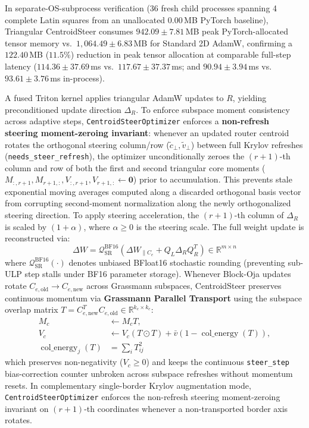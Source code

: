\documentclass[10pt,twocolumn,letterpaper]{article}
\begin{document}
\begin{enumerate}
    In separate-OS-subprocess verification (36 fresh child processes spanning 4 complete Latin squares from an unallocated $0.00$\,MB PyTorch baseline), Triangular CentroidSteer consumes $942.09 \pm 7.81$\,MB peak PyTorch-allocated tensor memory vs.\ $1,064.49 \pm 6.83$\,MB for Standard 2D AdamW, confirming a $122.40$\,MB ($11.5\%$) reduction in peak tensor allocation at comparable full-step latency ($114.36 \pm 37.69$\,ms vs.\ $117.67 \pm 37.37$\,ms; and $90.94 \pm 3.94$\,ms vs.\ $93.61 \pm 3.76$\,ms in-process).
\end{enumerate}

A fused Triton kernel applies triangular AdamW updates to $R$, yielding preconditioned update direction $\Delta_R$. To enforce subspace moment consistency across adaptive steps, \texttt{CentroidSteerOptimizer} enforces a \textbf{non-refresh steering moment-zeroing invariant}: whenever an updated router centroid rotates the orthogonal steering column/row ($\tilde{c}_\perp, \tilde{v}_\perp$) between full Krylov refreshes (\texttt{needs\_steer\_refresh}), the optimizer unconditionally zeroes the $(r+1)$-th column and row of both the first and second triangular core moments ($M_{:, r+1}, M_{r+1, :}, V_{:, r+1}, V_{r+1, :} \leftarrow \mathbf{0}$) prior to accumulation. This prevents stale exponential moving averages computed along a discarded orthogonal basis vector from corrupting second-moment normalization along the newly orthogonalized steering direction. To apply steering acceleration, the $(r+1)$-th column of $\Delta_R$ is scaled by $(1 + \alpha)$, where $\alpha \ge 0$ is the steering scale. The full weight update is reconstructed via:
\begin{equation}
    \Delta W = \mathcal{Q}_{\text{SR}}^{\text{BF16}}\!\left(\Delta W_{\parallel C_e} + Q_L \Delta_R Q_R^T\right) \in \mathbb{R}^{m \times n}
\end{equation}
where $\mathcal{Q}_{\text{SR}}^{\text{BF16}}(\cdot)$ denotes unbiased BFloat16 stochastic rounding (preventing sub-ULP step stalls under BF16 parameter storage). Whenever Block-Oja updates rotate $C_{e,\text{old}} \to C_{e,\text{new}}$ across Grassmann subspaces, CentroidSteer preserves continuous momentum via \textbf{Grassmann Parallel Transport} using the subspace overlap matrix $T = C_{e,\text{new}}^T C_{e,\text{old}} \in \mathbb{R}^{k_c \times k_c}$:
\begin{equation}
\begin{aligned}
    M_c &\leftarrow M_c T, \\
    V_c &\leftarrow V_c (T \odot T) + \bar{v} \left(1 - \operatorname{col\_energy}(T)\right), \\
    \operatorname{col\_energy}_j(T) &= \sum_i T_{ij}^2
\end{aligned}
\end{equation}
which preserves non-negativity ($V_c \ge 0$) and keeps the continuous \texttt{steer\_step} bias-correction counter unbroken across subspace refreshes without momentum resets. In complementary single-border Krylov augmentation mode, \texttt{CentroidSteerOptimizer} enforces the non-refresh steering moment-zeroing invariant on $(r+1)$-th coordinates whenever a non-transported border axis rotates.
\end{document}
